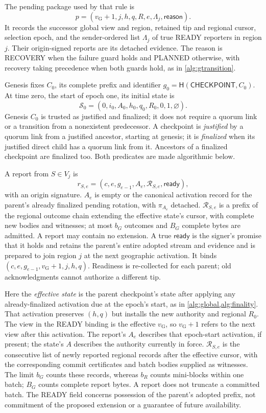 \documentclass[11pt,a4paper,onecolumn]{article}
\newcommand{\Hash}{\mathsf H}
\newcommand{\gv}{v_{\mathrm G}}
\newcommand{\Tag}[1]{\mathsf{#1}}
\theoremstyle{remark}\newtheorem{example}[definition]{Example}
\begin{document}
The pending package used by that rule is
\[
 p=(\gv+1,j,h,q,R,e,\Lambda_j,\mathsf{reason}).
\]
It records the successor global view and region, retained tip and regional
cursor, selection epoch, and the sender-ordered list $\Lambda_j$ of true READY
reporters in region $j$. Their origin-signed reports are its detached evidence.
The reason is RECOVERY when the failure guard holds and PLANNED otherwise,
with recovery taking precedence when both guards hold, as in
\cref{alg:gtransition}.

Genesis fixes $C_0$, its complete prefix and identifier
$g_0=\Hash(\Tag{CHECKPOINT},C_0)$. At time zero, the start of epoch one,
its initial state is
\[
 \mathcal S_0=(0,i_0,A_0,h_0,q_0,R_0,0,1,\varnothing).
\]
Genesis $C_0$ is trusted as justified and finalized; it does not require a
quorum link or a transition from a nonexistent predecessor.
A checkpoint is \emph{justified} by a quorum link from a justified ancestor,
starting at genesis; it is \emph{finalized} when its justified direct child has
a quorum link from it. Ancestors of a finalized checkpoint are finalized too.
Both predicates are made algorithmic below.


A report from $S\in V_j$ is
\[
 r_{S,e}=(c,e,g_{e-1},A_e,\mathcal R_{S,e},\mathsf{ready}),
\]
with an origin signature. $A_e$ is empty or the canonical activation record
for the parent's already finalized pending rotation, with $\pi_{A_e}$ detached. $\mathcal R_{S,e}$ is a prefix of the
regional outcome chain extending the effective state's cursor, with complete
new bodies and witnesses; at most $b_G$ outcomes and $B_G$ complete bytes are
admitted. A report may contain no extension. A true $\mathsf{ready}$ is the
signer's promise that it holds and retains the parent's entire adopted stream
and evidence and is prepared to join region $j$ at the next geographic
activation. It binds $(c,e,g_{e-1},\gv+1,j,h,q)$. Readiness is re-collected for each
parent; old acknowledgments cannot authorize a different tip.

Here the \emph{effective state} is the parent checkpoint's state after applying
any already-finalized activation due at the epoch's start, as in
\cref{alg:global,alg:finality}. That activation preserves $(h,q)$ but installs
the new authority and regional $R_0$. The view in the READY binding is the
effective $\gv$, so $\gv+1$ refers to the next view after this activation.
The report's $A_e$ describes that epoch-start activation, if present; the
state's $A$ describes the authority currently in force.
$\mathcal R_{S,e}$ is the consecutive list of newly reported regional records
after the effective cursor, with the corresponding commit certificates and
batch bodies supplied as witnesses. The limit $b_G$ counts these records,
whereas $b_R$ counts mini-blocks within one batch; $B_G$ counts complete report
bytes. A report does not truncate a committed batch. The READY field concerns
possession of the parent's adopted prefix, not commitment of the proposed
extension or a guarantee of future availability.
\end{document}
